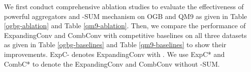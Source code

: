 \documentclass{article} \usepackage{iclr2021_conference,times}
\begin{document}
We first conduct comprehensive ablation studies to evaluate the effectiveness of powerful aggregators and -SUM mechanism on OGB and QM9 as given in Table \ref{ogbg-ablation} and Table \ref{qm9-ablation}.
Then, we compare the performance of ExpandingConv and CombConv with competitive baselines on all three datasets as given in Table \ref{ogbg-baselines} and Table \ref{qm9-baselines} to show their improvements.
ExpC- denotes ExpandingConv with .
We use ExpC* and CombC* to denote the ExpandingConv and CombConv without -SUM.
\begin{table}[h]
\centering
\caption{Ablation studies on OGB and QM9. Higher is better.}\smallskip
{}
\label{ogbg-ablation}
\end{table}
\end{document}
